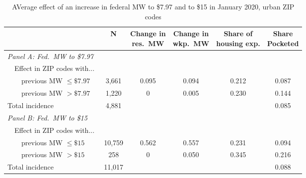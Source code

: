 \begin{table}[hbt!]
    \centering
    \caption{AVerage effect of an increase in federal MW to \$7.97 and to \$15 
             in January 2020, urban ZIP codes}
    \label{tab:counterfactuals_other}

    \begin{tabular}{@{}lccccc@{}}
        \toprule
                         & N & \shortstack{Change in\\res.\ MW}
                             & \shortstack{Change in\\wkp.\ MW}
                             & \shortstack{Share of\\housing exp.}  
                             & \shortstack{Share\\Pocketed}                      \\ \midrule
        \textit{Panel A: Fed.\ MW to \$7.97}         &      &       &       &     &      \\
        $\quad $Effect in ZIP codes with...          &      &       &       &     &      \\
        $\quad \quad$previous MW $\leq\$7.97\quad$   & 3,661 &  0.095 & 0.094  & 0.212 &  0.087   \\
        $\quad \quad$previous MW $>\$7.97\quad$      & 1,220 &  0 & 0.005  & 0.230 & 0.144    \\
        Total incidence                              & 4,881 &      &      &     & 0.085    \\[.3em]
        \textit{Panel B: Fed.\ MW to \$15}           &      &       &       &     &      \\
        $\quad $Effect in ZIP codes with...          &      &       &       &     &      \\
        $\quad \quad$previous MW $\leq\$15\quad$     & 10,759 &  0.562 & 0.557  & 0.231 &  0.094   \\
        $\quad \quad$previous MW $>\$15\quad$        & 258 &  0 & 0.050  & 0.345 & 0.216    \\
        Total incidence                              & 11,017 &      &      &     & 0.088    \\ \bottomrule
    \end{tabular}
    

\end{table}
